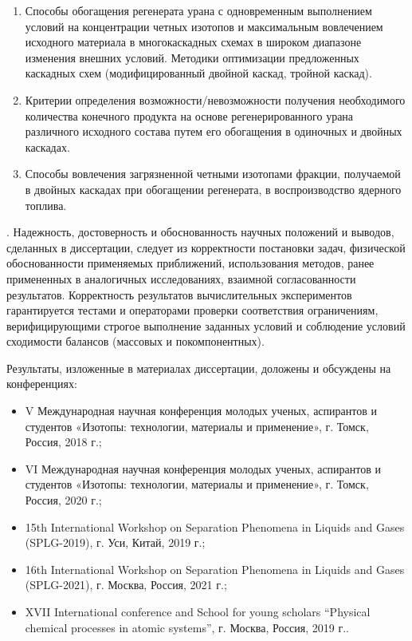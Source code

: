 {}
\begin{enumerate}
  \item Способы обогащения регенерата урана с одновременным выполнением условий на концентрации четных изотопов и максимальным вовлечением исходного материала в многокаскадных схемах в широком диапазоне изменения внешних условий. Методики оптимизации предложенных каскадных схем (модифицированный двойной каскад, тройной каскад).
  \item Критерии определения возможности/невозможности получения необходимого количества конечного продукта на основе регенерированного урана различного исходного состава путем его обогащения в одиночных и двойных каскадах.
  \item Способы вовлечения загрязненной четными изотопами фракции, получаемой в двойных каскадах при обогащении регенерата, в воспроизводство ядерного топлива.
\end{enumerate}

{\reliability}.
Надежность, достоверность и обоснованность научных положений и выводов, сделанных в диссертации, следует из корректности постановки задач, физической обоснованности применяемых приближений, использования методов, ранее примененных в аналогичных исследованиях, взаимной согласованности результатов. Корректность результатов вычислительных экспериментов гарантируется тестами и операторами проверки соответствия ограничениям, верифицирующими строгое выполнение заданных условий и соблюдение условий сходимости балансов (массовых и покомпонентных).

{\probation}
Результаты, изложенные в материалах диссертации, доложены и обсуждены на конференциях:
\begin{itemize}
  \item V Международная научная конференция молодых ученых, аспирантов и студентов «Изотопы: технологии, материалы и применение», г. Томск, Россия, 2018 г.;
  \item VI Международная научная конференция молодых ученых, аспирантов и студентов «Изотопы: технологии, материалы и применение», г. Томск, Россия, 2020 г.;
  \item 15th International Workshop on Separation Phenomena in Liquids and Gases (SPLG-2019), г. Уси, Китай, 2019 г.;
  \item 16th International Workshop on Separation Phenomena in Liquids and Gases (SPLG-2021), г. Москва, Россия, 2021 г.;
  \item XVII International conference and School for young scholars “Physical chemical processes in atomic systems”, г. Москва, Россия, 2019 г..
\end{itemize}

